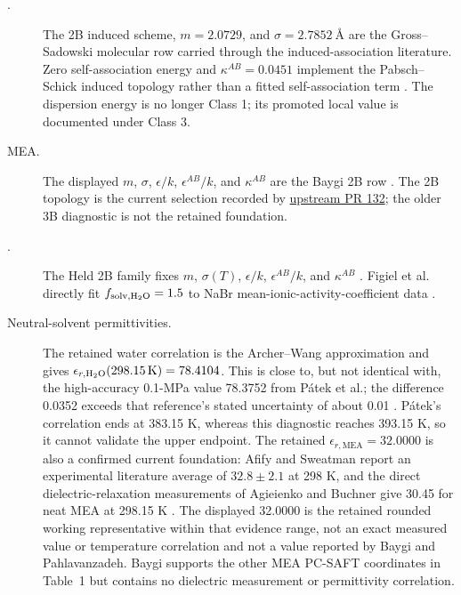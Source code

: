 \documentclass[10pt,oneside]{scrartcl}
\begin{document}
\begin{description}
\item[.] The 2B induced scheme, $m=2.0729$, and
$\sigma=\SI{2.7852}{\angstrom}$ are the Gross--Sadowski molecular row carried
through the induced-association literature. Zero self-association energy and
$\kappa^{AB}=0.0451$ implement the Pabsch--Schick induced topology rather than
a fitted  self-association term \cite{Gross2001,Pabsch2020,Schick2023}.
The dispersion energy is no longer Class 1; its promoted local value is
documented under Class 3.

\item[MEA.] The displayed $m$, $\sigma$, $\epsilon/k$,
$\epsilon^{AB}/k$, and $\kappa^{AB}$ are the Baygi 2B row
\cite{Baygi2015}. The 2B topology is the current selection recorded by
\href{https://github.com/tannerpolley/ePC-SAFT/pull/132}{upstream PR 132}; the
older 3B diagnostic is not the retained foundation.

\item[.] The Held 2B family fixes $m$, $\sigma(T)$,
$\epsilon/k$, $\epsilon^{AB}/k$, and $\kappa^{AB}$
\cite{Held2008,Schick2023}. Figiel et al. directly fit
$f_{\mathrm{solv},\ce{H2O}}=1.5$ to NaBr mean-ionic-activity-coefficient
data \cite[Eqns.~8--10 and Tables~2--3]{Figiel2025}.

\item[Neutral-solvent permittivities.] The retained water correlation is the
Archer--Wang approximation and gives
$\epsilon_{r,\ce{H2O}}(298.15\,\mathrm K)=78.4104$. This is close to, but not
identical with, the high-accuracy 0.1-MPa value 78.3752 from P\'atek et al.;
the difference 0.0352 exceeds that reference's stated uncertainty of about
0.01 \cite[Eq.~11 and Tables~7--8]{patekReferenceCorrelationsThermophysical2009}.
P\'atek's correlation ends at 383.15 K, whereas this diagnostic reaches
393.15 K, so it cannot validate the upper endpoint.
The retained
$\epsilon_{r,\mathrm{MEA}}=32.0000$ is also a confirmed current foundation:
Afify and Sweatman report an
experimental literature average of $32.8\pm2.1$ at 298 K, and the direct
dielectric-relaxation measurements of Agieienko and Buchner give 30.45 for
neat MEA at 298.15 K \cite[Table~II]{afifyMolecularDynamicsSimulation2018}
\cite[p.~2314]{agieienkoWhatGasStream2024}. The displayed 32.0000 is the
retained rounded working representative within that evidence range, not an
exact measured value or temperature correlation and not a value reported by
Baygi and Pahlavanzadeh. Baygi supports the other MEA PC-SAFT coordinates in
Table~1 but contains no dielectric measurement or permittivity correlation.


\end{description}
\end{document}
